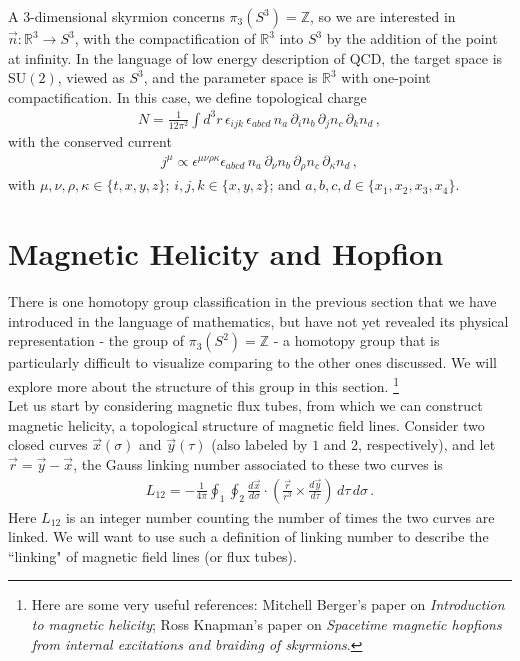 \documentclass[11pt, onesided]{book}
\theoremstyle{break}
\theoremstyle{break}
\newcommand{\R}{\mathbb{R}}
\newcommand{\Z}{\mathbb{Z}}
\newcommand{\pd}{\partial}
\begin{document}
A $3$-dimensional skyrmion concerns $\pi_3(S^3) = \Z$, so we are interested in $\vec{n}: \R^3 \to S^3$, with the compactification of $\R^3$ into $S^3$ by the addition of the point at infinity. In the language of low energy description of QCD, the target space is SU$(2)$, viewed as $S^3$, and the parameter space is $\R^3$ with one-point compactification. In this case, we define topological charge
\begin{align*}
N = \frac{1}{12\pi^2} \int d^3r \, \epsilon_{ijk}\,\epsilon_{abcd} \, n_a\,\pd_i n_b\, \pd_jn_c \, \pd_k n_d\,,
\end{align*}
with the conserved current
\begin{align*}
j^\mu \propto \epsilon^{\mu\nu\rho\kappa} \epsilon_{abcd}\, n_{a} \, \pd_\nu n_b \, \pd_\rho n_c \, \pd_\kappa n_d\,,
\end{align*}
with $\mu,\nu,\rho, \kappa \in \{t,x,y,z\}$; $i,j,k\in\{x,y,z\}$; and $a,b,c,d \in \{x_1,x_2,x_3,x_4\}$. 

\section{Magnetic Helicity and Hopfion}
There is one homotopy group classification in the previous section that we have introduced in the language of mathematics, but have not yet revealed its physical representation - the group of $\pi_3(S^2) = \Z$ - a homotopy group that is particularly difficult to visualize comparing to the other ones discussed. We will explore more about the structure of this group in this section. \footnote{Here are some very useful references: Mitchell Berger's paper on \textit{Introduction to magnetic helicity}; Ross Knapman's paper on \textit{Spacetime magnetic hopfions from internal excitations and braiding of skyrmions}.}\\

Let us start by considering magnetic flux tubes, from which we can construct magnetic helicity, a topological structure of magnetic field lines. Consider two closed curves $\vec{x}(\sigma)$ and $\vec{y}(\tau)$ (also labeled by $1$ and $2$, respectively), and let $\vec{r} = \vec{y}-\vec{x}$, the Gauss linking number associated to these two curves is 
\begin{align*}
L_{12} = -\frac{1}{4\pi}\oint_1 \oint_2 \frac{d\vec{x}}{d\sigma}\cdot \left( \frac{\vec{r}}{r^3} \times \frac{d\vec{y}}{d\tau}\right) \, d\tau	\, d\sigma\,. \tag{*}
\end{align*}
Here $L_{12}$ is an integer number counting the number of times the two curves are linked. We will want to use such a definition of linking number to describe the ``linking" of magnetic field lines (or flux tubes). \\
\end{document}
